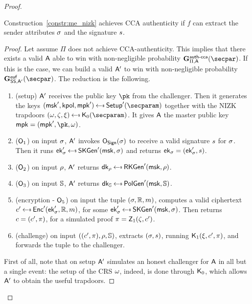 \begin{proof}
    \begin{lemma}\label{lemma:me_auth}
        Construction~\ref{constr:me_nizk} achieves CCA authenticity if $f$ can extract the sender attributes $\sigma$ and the signature $s$.
        \begin{proof}
            Let assume $\Pi$ does not achieve CCA-authenticity.
            This implies that there exists a valid $\mathsf{A}$ able to win with non-negligible probability $\NISHeufgamecca{}_{\Pi, \adversary}(\secpar)$.
            If this is the case, we can build a valid $\mathsf{A}'$ to win with non-negligible probability $\Sigeufgame_{\sig, \adversary'}(\secpar)$.
            The reduction is the following.

            \begin{enumerate}
                \item (setup) $\mathsf{A}'$ receives the public key $\pk$ from the challenger. Then it generates the keys $(\msk', \kpol, \mpk') \getsr \setup'(\secparam)$ together with the NIZK trapdoors $(\crs,\tpsim,\tpext)\getsr\nizkext_0(\secparam)$. It gives $\mathsf{A}$ the master public key $\mpk = (\mpk', \pk, \crs)$.
                \item ($\mathsf{O}_1$) on input $\sigma$, $\mathsf{A}'$ invokes $\mathsf{O}_{\mathsf{Sign}}(\sigma)$ to receive a valid signature $s$ for $\sigma$. Then it runs $\ek'_\sattr \getsr \skgen'(\msk, \sattr)$ and returns $\mathsf{ek}_\sigma = (\mathsf{ek}_\sigma', s)$.
                \item ($\mathsf{O}_2$) on input $\rho$, $\mathsf{A}'$ returns $\dk_\rattr \getsr \rkgen'(\msk, \rattr)$.
                \item ($\mathsf{O}_3$) on input $\mathbb{S}$, $\mathsf{A}'$ returns $\dk_\saccess \getsr \polgen'(\msk, \saccess)$.
                \item (encryption - $\mathsf{O}_5$) on input the tuple $(\sigma, \mathbb{R}, m)$, computes a valid ciphertext $\cipher' \getsr \enc'(\ek'_\sattr, \raccess, \msg)$, for some $\ek'_\sattr \getsr \skgen'(\msk, \sattr)$. Then returns $c = (c', \pi)$, for a simulated proof $\pi = \mathsf{Z}_1(\zeta, c')$.
                \item (challenge) on input $((c', \pi), \rho, \mathbb{S})$, extracts $(\sigma, s)$, running $\mathsf{K}_1(\xi, c', \pi)$, and forwards the tuple to the challenger.
            \end{enumerate}
            First of all, note that on setup $\mathsf{A}'$ simulates an honest challenger for $\mathsf{A}$ in all but a single event: the setup of the CRS $\omega$, indeed, is done through $\mathsf{K}_0$, which allows $\mathsf{A}'$ to obtain the useful trapdoors.

\end{proof}
\end{lemma}
\end{proof}
